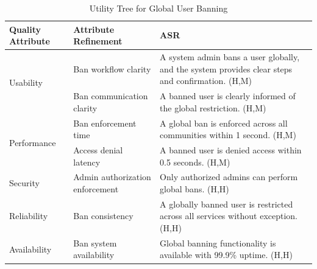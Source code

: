 \documentclass{article}
\begin{document}
\begin{table}[H]
    \centering
    \caption{Utility Tree for Global User Banning}
    \begin{tabular}{|p{3cm}|p{4cm}|p{7cm}|}
        \hline
        \textbf{Quality Attribute} & \textbf{Attribute Refinement}                                                                    & \textbf{ASR} \\
        \hline

        \multirow{2}{*}{Usability}
                                   & Ban workflow clarity
                                   & A system admin bans a user globally, and the system provides clear steps and confirmation. (H,M)                \\
        \cline{2-3}
                                   & Ban communication clarity
                                   & A banned user is clearly informed of the global restriction. (H,M)                                              \\
        \hline

        \multirow{2}{*}{Performance}
                                   & Ban enforcement time
                                   & A global ban is enforced across all communities within 1 second. (H,M)                                          \\
        \cline{2-3}
                                   & Access denial latency
                                   & A banned user is denied access within 0.5 seconds. (H,M)                                                        \\
        \hline

        Security
                                   & Admin authorization enforcement
                                   & Only authorized admins can perform global bans. (H,H)                                                           \\
        \hline

        Reliability
                                   & Ban consistency
                                   & A globally banned user is restricted across all services without exception. (H,H)                               \\
        \hline

        Availability
                                   & Ban system availability
                                   & Global banning functionality is available with 99.9\% uptime. (H,H)                                             \\
        \hline


\end{tabular}
\end{table}
\end{document}
